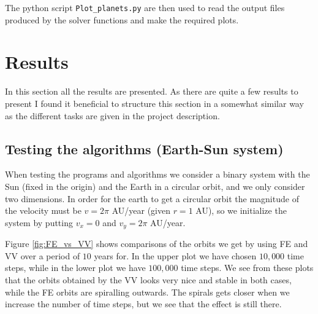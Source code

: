 \documentclass[12pt, a4paper]{article}
\begin{document}
The python script \texttt{Plot\_planets.py} are then used to read the output files produced by the solver 
functions and make the required plots. 

\section{Results}

In this section all the results are presented. As there are quite a few results to present I found it 
beneficial to structure this section in a somewhat similar way as the different tasks are given in the 
project description. 

\subsection{Testing the algorithms (Earth-Sun system)}

When testing the programs and algorithms we consider a binary system with the Sun (fixed in the origin) 
and the Earth in a circular orbit, and we only consider two dimensions. In order for the earth to 
get a circular orbit the magnitude of the velocity must be $v=2\pi$ AU/year (given $r = 1$ AU), so we 
initialize the system by putting $v_x = 0$ and $v_y = 2\pi$ AU/year. 

Figure \ref{fig:FE_vs_VV} shows comparisons of the orbits we get by using FE and VV 
over a period of $10$ years for. In the upper plot we have chosen $10,000$ time steps, while in 
the lower plot we have $100,000$ time steps. We see from these plots that the orbits obtained by the 
VV looks very nice and stable in both cases, while the FE orbits are spiralling outwards. The spirals 
gets closer when we increase the number of time steps, but we see that the effect is still there. 
\end{document}
